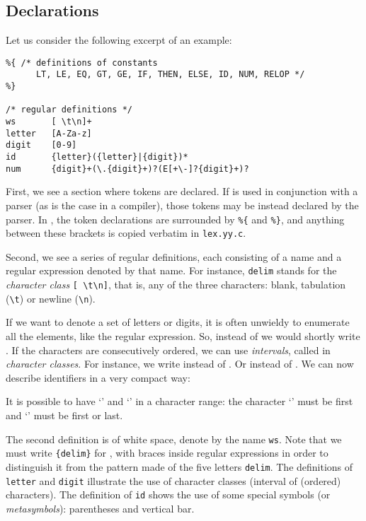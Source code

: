 \subsection*{Declarations}

Let us consider the following excerpt of an example:
\begin{verbatim}
%{ /* definitions of constants
      LT, LE, EQ, GT, GE, IF, THEN, ELSE, ID, NUM, RELOP */
%}

/* regular definitions */
ws       [ \t\n]+
letter   [A-Za-z]
digit    [0-9]
id       {letter}({letter}|{digit})*
num      {digit}+(\.{digit}+)?(E[+\-]?{digit}+)?
\end{verbatim}
First, we see a section where tokens are declared. If \Lex is used in
conjunction with a parser (as is the case in a compiler), those tokens
may be instead declared by the parser. In \Lex, the token declarations
are surrounded by \verb+%{+ and \verb+%}+, and anything between these
brackets is copied verbatim in \texttt{lex.yy.c}.

Second, we see a series of regular definitions, each consisting of a
name and a regular expression denoted by that name. For instance,
\texttt{delim} stands for the \emph{character class} \verb+[ \t\n]+,
that is, any of the three characters: blank, tabulation (\verb+\t+) or
newline (\verb+\n+).

If we want to denote a set of letters or digits, it is often unwieldy
to enumerate all the elements, like the  regular
expression. So, instead of  \disj {} \disj {} we
would shortly write \lb{}\rb. If the characters are
consecutively ordered, we can use \emph{intervals}, called in \Lex
\emph{character classes}. For instance, we write
\lb{}\dash{}\rb{} instead of  \disj {} \disj
{}. Or \lb{}\dash{}\rb{} instead of  \disj
{} \disj {} \disj {} \disj {} \disj {} \disj
{} \disj {} \disj {} \disj {}. We can now describe
identifiers in a very compact way:
\begin{center}
\lb{}\dash{}\dash{}\rb\lb{}\dash{}\dash{}\dash{}\rb\kleene
\end{center}
It is possible to have `\exc{]}' and `\exc{-}' in a character range:
  the character `\exc{]}' must be first and `\exc{-}' must be first or
    last.

The second definition is of white space, denote by the name
\texttt{ws}. Note that we must write \verb+{delim}+ for ,
with braces inside regular expressions in order to distinguish it from
the pattern made of the five letters \verb+delim+. The definitions of
\texttt{letter} and \texttt{digit} illustrate the use of character
classes (interval of (ordered) characters). The definition of
\texttt{id} shows the use of some \Lex special symbols (or
\emph{metasymbols}): parentheses and vertical bar.

